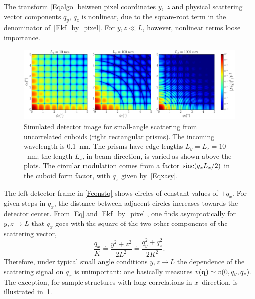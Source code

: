 The transform \cref{Eqalgo} between pixel coordinates $y$,~$z$
and physical scattering vector components $q_y$, $q_z$
is nonlinear, due to the square-root term in the denominator of~\cref{Ekf_by_pixel}.
For $y,z\ll L$, however, nonlinear terms loose importance.

\begin{figure}[t]
\begin{center}
\includegraphics[width=1\textwidth]{fig/gisasmap/ff_det_box.pdf}
\end{center}
\caption{Simulated detector image for small-angle scattering from
uncorrelated cuboids (right rectangular prisms).
The incoming wavelength is 0.1~nm.
The prisms have edge lengths $L_y=L_z=10$~nm;
the length $L_x$, in beam direction, is varied as shown above the plots.
%
The circular modulation comes from a factor $\operatorname{sinc}(q_x L_x/2)$
in the cuboid form factor, with $q_x$ given by~\cref{Eqxasy}.}
\label{Fdetbox}
\end{figure}

The left detector frame in \cref{Fconstq}
shows circles of constant values of $\pm q_x$.
For given steps in $q_x$, the distance between adjacent circles
increases towards the detector center.
From \cref{Eq} and \cref{Ekf_by_pixel},
one finds asymptotically for $y,z\to L$
that $q_x$ goes with the square of the two other components of the scattering vector,
\begin{equation}\label{Eqxasy}
  \frac{q_x}{K}
  \doteq \frac{y^2+z^2}{2 L^2}
  \doteq \frac{q_y^2 + q_z^2}{2K^2}.
\end{equation}
Therefore, under typical small angle conditions $y,z\to L$
the dependence of the scattering signal on $q_x$ is unimportant:
one basically measures $v(\mathbf{q})\simeq v(0,q_y,q_z)$.
The exception, for sample structures with long correlations in $x$~direction,
is illustrated in~\cref{Fdetbox}.

